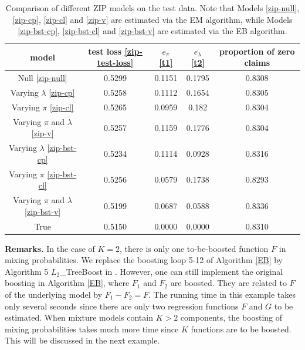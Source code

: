 \documentclass[11pt]{article}
\numberwithin{equation}{section}
\begin{document}
\begin{table}[htp!]
	\caption{Comparison of different ZIP models on the test data. Note that Models \eqref{zip-null}, \eqref{zip-cp}, \eqref{zip-cl} and \eqref{zip-v} are estimated via the EM algorithm, while Models \eqref{zip-bst-cp}, \eqref{zip-bst-cl} and \eqref{zip-bst-v} are estimated via the EB algorithm.} \label{zip}
	\centering
	\begin{tabular}{ccccc}
		
		\hline
		model   & test loss \eqref{zip-test-loss}  & $e_\pi$ \eqref{t1}& $e_\lambda$ \eqref{t2} & proportion of zero claims \\ \hline
		Null \eqref{zip-null}    & 0.5299 & 0.1151     & 0.1795     & 0.8308        \\
		Varying $\lambda$ \eqref{zip-cp} & 0.5258 & 0.1112     & 0.1654     & 0.8305        \\
		Varying $\pi$ \eqref{zip-cl} & 0.5265 & 0.0959     & 0.182      & 0.8304        \\
		Varying $\pi$ and $\lambda$  \eqref{zip-v} & 0.5257 & 0.1159     & 0.1776     & 0.8304        \\
		Varying $\lambda$  \eqref{zip-bst-cp} & 0.5234 & 0.1114     & 0.0928     & 0.8316        \\
		Varying $\pi$   \eqref{zip-bst-cl} & 0.5256 & 0.0579     & 0.1738     & 0.8293        \\
		Varying $\pi$ and $\lambda$  \eqref{zip-bst-v}  & 0.5199 & 0.0687     & 0.0588     & 0.8336        \\
		True    & 0.5150  & 0.0000         & 0.0000         & 0.8310         \\ \hline
	\end{tabular}
\end{table}

{\bf Remarks.}
In the case of $K=2$, there is only one to-be-boosted function $F$ in mixing probabilities. 
We replace the boosting loop 5-12 of Algorithm \ref{EB} by  Algorithm 5 $L_2$\_TreeBoost in \citet{friedman2001greedy}. 
However, one can still implement the original boosting in Algorithm \ref{EB}, where $F_1$ and $F_2$ are boosted. They are related to $F$ of the underlying model by $F_1-F_2=F.$
The running time in this example takes only several seconds since there are only two regression functions $F$ and $G$ to be estimated.
When mixture models contain $K>2$ components, the boosting of mixing probabilities takes much more time since $K$ functions are to be boosted. This will be discussed in the next example.
\end{document}
